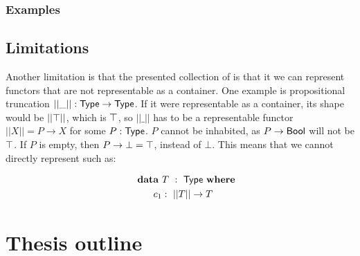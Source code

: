 \documentclass[a4paper,10pt]{report}
\begin{document}

\subsection{Examples}


\section{Limitations}


Another limitation is that the presented collection of \onehits is
that it we can represent functors that are not representable as a
container. One example is propositional truncation
$|| \_ || : \mathsf{Type} \to \mathsf{Type}$. If it were representable as a container,
its shape would be $|| \top ||$, which is $\top$, so $|| \_ ||$
has to be a representable functor $|| X || = P \to X$ for some
$P : \mathsf{Type}$. $P$ cannot be inhabited, as $P \to \operatorname{\mathsf{Bool}}$ will not be
$\top$. If $P$ is empty, then $P \to \bot = \top$, instead of
$\bot$. This means that we cannot directly represent \hits such as:

\begin{alignat*}{2}
  &\rlap{$\data\ T\ :\ \Type\ \where$} \\
  &&\ \ c_1     &:\ || T || \to T
\end{alignat*}

\chapter{Thesis outline}
\label{sec:outline}
\end{document}

